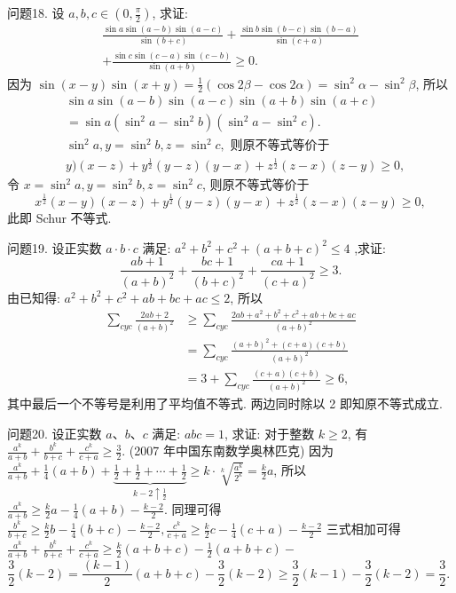 问题18. 设 $a, b, c \in\left(0, \frac{\pi}{2}\right)$, 求证:
$$
\begin{gathered}
\frac{\sin a \sin (a-b) \sin (a-c)}{\sin (b+c)}+\frac{\sin b \sin (b-c) \sin (b-a)}{\sin (c+a)} \\
+\frac{\sin c \sin (c-a) \sin (c-b)}{\sin (a+b)} \geqslant 0 .
\end{gathered}
$$
因为 $\sin (x-y) \sin (x+y)=\frac{1}{2}(\cos 2 \beta-\cos 2 \alpha)=\sin ^2 \alpha-\sin ^2 \beta$, 所以
$$
\begin{aligned}
& \sin a \sin (a-b) \sin (a-c) \sin (a+b) \sin (a+c) \\
&= \sin a\left(\sin ^2 a-\sin ^2 b\right)\left(\sin ^2 a-\sin ^2 c\right) . \\
& \sin ^2 a, y=\sin ^2 b, z=\sin ^2 c, \text { 则原不等式等价于 } \\
&y)(x-z)+y^{\frac{1}{2}}(y-z)(y-x)+z^{\frac{1}{2}}(z-x)(z-y) \geqslant 0,
\end{aligned}
$$
令 $x=\sin ^2 a, y=\sin ^2 b, z=\sin ^2 c$, 则原不等式等价于
$$
x^{\frac{1}{2}}(x-y)(x-z)+y^{\frac{1}{2}}(y-z)(y-x)+z^{\frac{1}{2}}(z-x)(z-y) \geqslant 0,
$$
此即 Schur 不等式.



问题19. 设正实数 $a\cdot b\cdot c$ 满足: $a^{2}+b^{2}+c^{2}+(a+b+c)^{2}\leq4$ ,求证:
$$
\frac{a b+1}{(a+b)^2}+\frac{b c+1}{(b+c)^2}+\frac{c a+1}{(c+a)^2} \geqslant 3 .
$$
由已知得: $a^2+b^2+c^2+a b+b c+a c \leqslant 2$, 所以
$$
\begin{aligned}
\sum_{c y c} \frac{2 a b+2}{(a+b)^2} & \geqslant \sum_{c y c} \frac{2 a b+a^2+b^2+c^2+a b+b c+a c}{(a+b)^2} \\
& =\sum_{c y c} \frac{(a+b)^2+(c+a)(c+b)}{(a+b)^2} \\
& =3+\sum_{c y c} \frac{(c+a)(c+b)}{(a+b)^2} \geqslant 6,
\end{aligned}
$$
其中最后一个不等号是利用了平均值不等式.
两边同时除以 2 即知原不等式成立.



问题20. 设正实数 $a 、 b 、 c$ 满足: $a b c=1$, 求证: 对于整数 $k \geqslant 2$, 有 $\frac{a^k}{a+b}+\frac{b^k}{b+c}+\frac{c^k}{c+a} \geqslant \frac{3}{2}$. (2007 年中国东南数学奥林匹克)
因为 $\frac{a^k}{a+b}+\frac{1}{4}(a+b)+\underbrace{\frac{1}{2}+\frac{1}{2}+\cdots+\frac{1}{2}}_{k-2 \uparrow \frac{1}{2}} \geqslant k \cdot \sqrt[k]{\frac{a^k}{2^k}}=\frac{k}{2} a$,
所以 $\frac{a^k}{a+b} \geqslant \frac{k}{2} a-\frac{1}{4}(a+b)-\frac{k-2}{2}$.
同理可得 $\frac{b^k}{b+c} \geqslant \frac{k}{2} b-\frac{1}{4}(b+c)-\frac{k-2}{2}, \frac{c^k}{c+a} \geqslant \frac{k}{2} c-\frac{1}{4}(c+a)-\frac{k-2}{2}$
三式相加可得 $\frac{a^k}{a+b}+\frac{b^k}{b+c}+\frac{c^k}{c+a} \geqslant \frac{k}{2}(a+b+c)-\frac{1}{2}(a+b+c)-$
$$
\frac{3}{2}(k-2)=\frac{(k-1)}{2}(a+b+c)-\frac{3}{2}(k-2) \geqslant \frac{3}{2}(k-1)-\frac{3}{2}(k-2)=\frac{3}{2} \text {. }
$$



